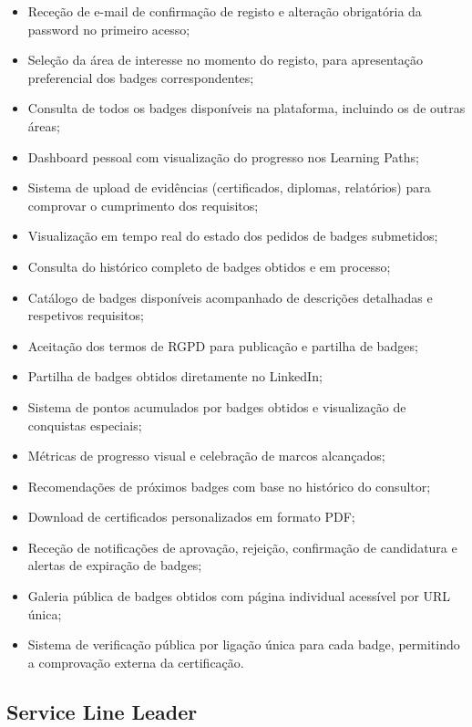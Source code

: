 \documentclass[12pt,a4paper]{report}
\begin{document}
\begin{itemize}
  \item Receção de e-mail de confirmação de registo e alteração obrigatória da password no primeiro acesso;
  \item Seleção da área de interesse no momento do registo, para apresentação preferencial dos badges correspondentes;
  \item Consulta de todos os badges disponíveis na plataforma, incluindo os de outras áreas;
  \item Dashboard pessoal com visualização do progresso nos Learning Paths;
  \item Sistema de upload de evidências (certificados, diplomas, relatórios) para comprovar o cumprimento dos requisitos;
  \item Visualização em tempo real do estado dos pedidos de badges submetidos;
  \item Consulta do histórico completo de badges obtidos e em processo;
  \item Catálogo de badges disponíveis acompanhado de descrições detalhadas e respetivos requisitos;
  \item Aceitação dos termos de RGPD para publicação e partilha de badges;
  \item Partilha de badges obtidos diretamente no LinkedIn;
  \item Sistema de pontos acumulados por badges obtidos e visualização de conquistas especiais;
  \item Métricas de progresso visual e celebração de marcos alcançados;
  \item Recomendações de próximos badges com base no histórico do consultor;
  \item Download de certificados personalizados em formato PDF;
  \item Receção de notificações de aprovação, rejeição, confirmação de candidatura e alertas de expiração de badges;
  \item Galeria pública de badges obtidos com página individual acessível por URL única;
  \item Sistema de verificação pública por ligação única para cada badge, permitindo a comprovação externa da certificação.
\end{itemize}

\subsection{Service Line Leader}
\end{document}
